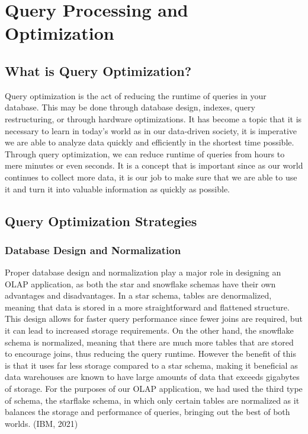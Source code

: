\section{Query Processing and Optimization}

\subsection{What is Query Optimization?}

Query optimization is the act of reducing the runtime of queries in your database. This may be done through database design, indexes, query restructuring, or through hardware optimizations. It has become a topic that it is necessary to learn in today's world as in our data-driven society, it is imperative we are able to analyze data quickly and efficiently in the shortest time possible. Through query optimization, we can reduce runtime of queries from hours to mere minutes or even seconds. It is a concept that is important since as our world continues to collect more data, it is our job to make sure that we are able to use it and turn it into valuable information as quickly as possible.

\subsection{Query Optimization Strategies}

\subsubsection{Database Design and Normalization}

Proper database design and normalization play a major role in designing an OLAP application, as both the star and snowflake schemas have their own advantages and disadvantages. In a star schema, tables are denormalized, meaning that data is stored in a more straightforward and flattened structure. This design allows for faster query performance since fewer joins are required, but it can lead to increased storage requirements. On the other hand, the snowflake schema is normalized, meaning that there are much more tables that are stored to encourage joins, thus reducing the query runtime. However the benefit of this is that it uses far less storage compared to a star schema, making it beneficial as data warehouses are known to have large amounts of data that exceeds gigabytes of storage. For the purposes of our OLAP application, we had used the third type of schema, the starflake schema, in which only certain tables are normalized as it balances the storage and performance of queries, bringing out the best of both worlds. (IBM, 2021) \\

